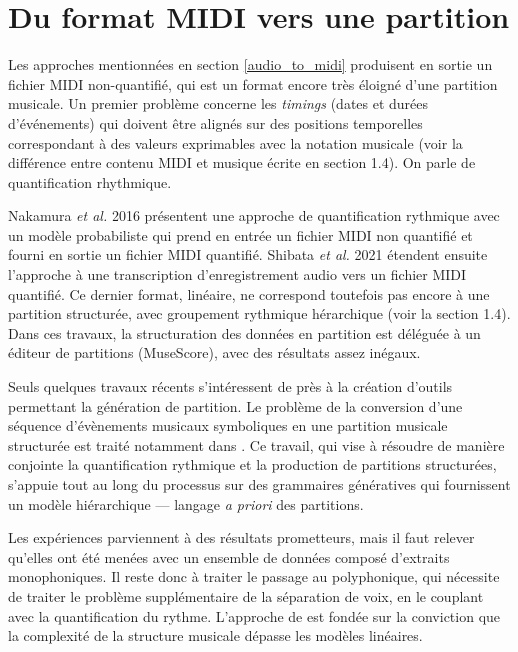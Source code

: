 \section{Du format MIDI vers une partition}
Les approches mentionnées en section \ref{audio_to_midi} produisent en sortie
un fichier MIDI non-quantifié, qui est un format encore très éloigné d’une
partition musicale. Un premier problème concerne les \textit{timings} (dates et durées
d’événements) qui doivent être alignés sur des positions temporelles
correspondant à des valeurs exprimables avec la notation musicale (voir la
différence entre contenu MIDI et musique écrite en section 1.4). On parle de
quantification rhythmique.

Nakamura \textit{et al.} 2016 présentent une approche de quantification rythmique avec
un modèle probabiliste qui prend en entrée un fichier MIDI non quantifié
et fourni en sortie un fichier MIDI quantifié. Shibata \textit{et al.} 2021 \cite{shibata} étendent
ensuite l’approche à une transcription d’enregistrement audio vers un fichier
MIDI quantifié. Ce dernier format, linéaire, ne correspond toutefois pas encore
à une partition structurée,  avec groupement rythmique hérarchique (voir la
section 1.4). Dans ces travaux, la structuration des données en partition est
déléguée à un éditeur de partitions (MuseScore), avec des résultats assez
inégaux.

Seuls quelques travaux récents s’intéressent de près à la création d’outils
permettant la génération de partition. Le problème de la conversion d’une
séquence d’évènements musicaux symboliques en une partition musicale structurée
est traité notamment dans \cite{foscarin}. Ce travail, qui vise à
résoudre de manière conjointe la quantification rythmique et la production de
partitions structurées, s’appuie tout au long du processus sur des grammaires
génératives qui fournissent un modèle hiérarchique — langage \textit{a priori} des
partitions.

Les expériences parviennent à des résultats prometteurs, mais il faut relever qu’elles
ont été menées avec un ensemble de données composé d’extraits monophoniques. Il
reste donc à traiter le passage au polyphonique, qui nécessite de traiter le
problème supplémentaire de la séparation de voix, en le couplant avec la
quantification du rythme. L’approche de \cite{foscarin} est fondée sur la
conviction que la complexité de la structure musicale dépasse les modèles
linéaires.

